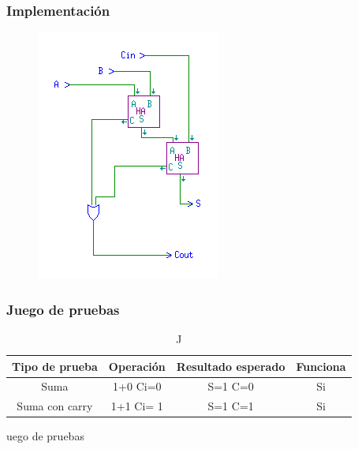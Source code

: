 \documentclass{article}
\begin{document}
		\subsubsection*{Implementación}
		 \begin{figure}[ht]
		 	\includegraphics[width=0.8\linewidth]{FA}
		 	\centering
		 \end{figure}


		\subsubsection*{Juego de pruebas}
			\begin{table}[h]
			\begin{center}
				\begin{tabular}{| c | c | c | c |}
					\hline
					Tipo de prueba & Operación & Resultado esperado & Funciona \\ \hline
					
					Suma & 1+0 Ci=0 & S=1 C=0 & Si \\ \hline
					Suma con carry & 1+1 Ci= 1 & S=1 C=1 & Si \\ \hline
				\end{tabular}
				\caption Juego de pruebas
			\end{center}
		\end{table}
\end{document}

